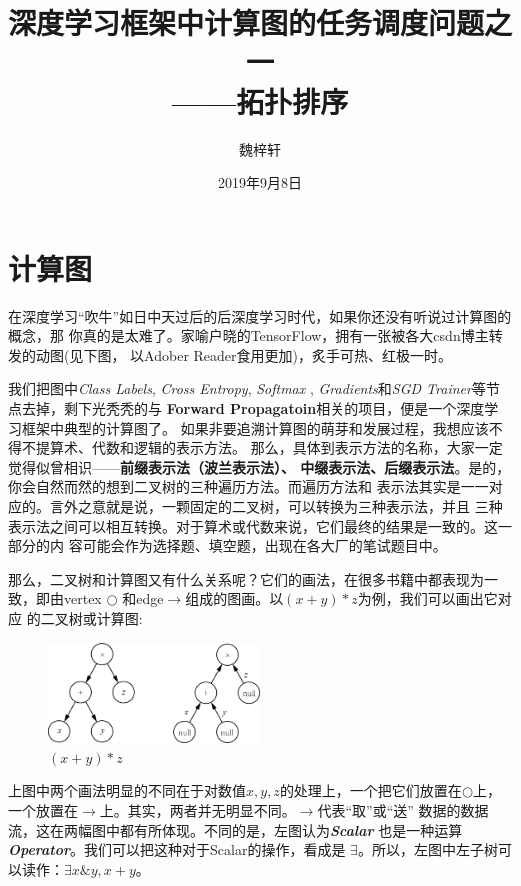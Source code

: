 \documentclass[12pt, a4paper]{article}
\begin{document}
\title{深度学习框架中计算图的任务调度问题之一\\——\textbf{拓扑排序}}
\author{魏梓轩}
\date{2019年9月8日}
\maketitle

\section{计算图}
在深度学习“吹牛”如日中天过后的后深度学习时代，如果你还没有听说过计算图的概念，那
你真的是太难了。家喻户晓的TensorFlow，拥有一张被各大csdn博主转发的动图(见下图，
以Adober Reader食用更加)，炙手可热、红极一时。

\begin{center}
\end{center}

我们把图中\textit{Class Labels}, \textit{Cross Entropy}, \textit{Softmax}
, \textit{Gradients}和\textit{SGD Trainer}等节点去掉，剩下光秃秃的与
\textbf{Forward Propagatoin}相关的项目，便是一个深度学习框架中典型的计算图了。
如果非要追溯计算图的萌芽和发展过程，我想应该不得不提算术、代数和逻辑的表示方法。
那么，具体到表示方法的名称，大家一定觉得似曾相识——\textbf{前缀表示法（波兰表示法）、
中缀表示法、后缀表示法}。是的，你会自然而然的想到二叉树的三种遍历方法。而遍历方法和
表示法其实是一一对应的。言外之意就是说，一颗固定的二叉树，可以转换为三种表示法，并且
三种表示法之间可以相互转换。对于算术或代数来说，它们最终的结果是一致的。这一部分的内
容可能会作为选择题、填空题，出现在各大厂的笔试题目中。

那么，二叉树和计算图又有什么关系呢？它们的画法，在很多书籍中都表现为一致，即由vertex
$\bigcirc$ 和edge$\rightarrow$组成的图画。以$(x+y)*z$为例，我们可以画出它对应
的二叉树或计算图:

\begin{figure}[h!]
  \centering
  \includegraphics[width=0.5\textwidth]{assets/tree.png}
  \caption{$(x+y)*z$}
\end{figure}

上图中两个画法明显的不同在于对数值$x,y,z$的处理上，一个把它们放置在$\bigcirc$上，
一个放置在$\rightarrow$上。其实，两者并无明显不同。$\rightarrow$代表“取”或“送”
数据的数据流，这在两幅图中都有所体现。不同的是，左图认为\textbf{\textit{Scalar}}
也是一种运算\textbf{\textit{Operator}}。我们可以把这种对于Scalar的操作，看成是
$\exists$。所以，左图中左子树可以读作：$\exists x \& y, x+y$。
\end{document}
